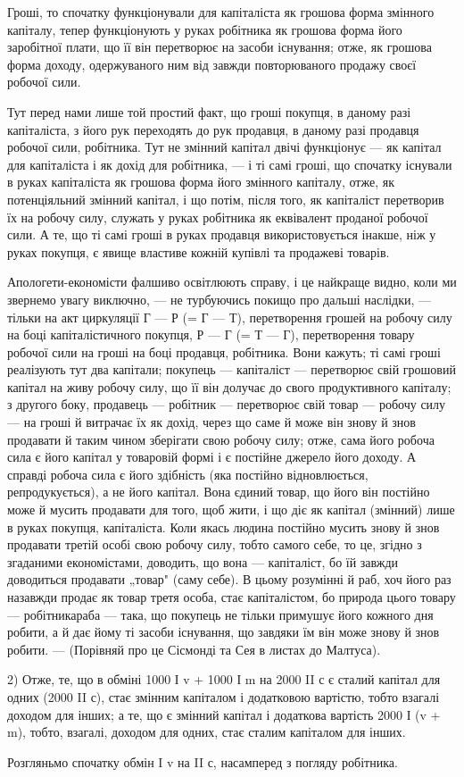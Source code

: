 Гроші, то спочатку функціонували для капіталіста як грошова
форма змінного капіталу, тепер функціонують у руках робітника як
грошова форма його заробітної плати, що її він перетворює на засоби
існування; отже, як грошова форма доходу, одержуваного ним від
завжди повторюваного продажу своєї робочої сили.

Тут перед нами лише той простий факт, що гроші покупця, в
даному разі капіталіста, з його рук переходять до рук продавця, в
даному разі продавця робочої сили, робітника. Тут не змінний капітал
двічі функціонує — як капітал для капіталіста і як дохід для робітника, —
і ті самі гроші, що спочатку існували в руках капіталіста як грошова
форма його змінного капіталу, отже, як потенціяльний змінний капітал, і
що потім, після того, як капіталіст перетворив їх на робочу силу, служать
у руках робітника як еквівалент проданої робочої сили. А те, що ті
самі гроші в руках продавця використовується інакше, ніж у руках покупця,
є явище властиве кожній купівлі та продажеві товарів.

Апологети-економісти фалшиво освітлюють справу, і це найкраще
видно, коли ми звернемо увагу виключно, — не турбуючись покищо про
дальші наслідки, — тільки на акт циркуляції Г — Р (= Г — Т), перетворення
грошей на робочу силу на боці капіталістичного покупця, Р — Г (= Т — Г),
перетворення товару робочої сили на гроші на боці продавця, робітника.
Вони кажуть; ті самі гроші реалізують тут два капітали; покупець —
капіталіст — перетворює свій грошовий капітал на живу робочу силу, що
її він долучає до свого продуктивного капіталу; з другого боку, продавець
— робітник — перетворює свій товар — робочу силу — на гроші й
витрачає їх як дохід, через що саме й може він знову й знов продавати
й таким чином зберігати свою робочу силу; отже, сама його робоча
сила є його капітал у товаровій формі і є постійне джерело його доходу.
А справді робоча сила є його здібність (яка постійно відновлюється,
репродукується), а не його капітал. Вона єдиний товар, що його він
постійно може й мусить продавати для того, щоб жити, і що діє як
капітал (змінний) лише в руках покупця, капіталіста. Коли якась людина
постійно мусить знову й знов продавати третій особі свою робочу силу,
тобто самого себе, то це, згідно з згаданими економістами, доводить,
що вона — капіталіст, бо їй завжди доводиться продавати „товар" (саму
себе). В цьому розумінні й раб, хоч його раз назавжди продає як
товар третя особа, стає капіталістом, бо природа цього товару — робітникараба
— така, що покупець не тільки примушує його кожного дня робити,
а й дає йому ті засоби існування, що завдяки їм він може знову й
знов робити. — (Порівняй про це Сісмонді та Сея в листах до Малтуса).

2) Отже, те, що в обміні 1000 І v + 1000 І m на 2000 II с є сталий
капітал для одних (2000 II с), стає змінним капіталом і додатковою
вартістю, тобто взагалі доходом для інших; а те, що є змінний капітал
і додаткова вартість 2000 І (v + m), тобто, взагалі, доходом для одних,
стає сталим капіталом для інших.

Розгляньмо спочатку обмін I v на II с, насамперед з погляду робітника.
